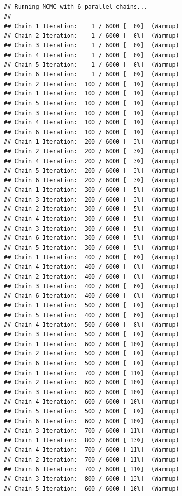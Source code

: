 \documentclass[
]{article}
\begin{document}
\begin{verbatim}
## Running MCMC with 6 parallel chains...
## 
## Chain 1 Iteration:    1 / 6000 [  0%]  (Warmup) 
## Chain 2 Iteration:    1 / 6000 [  0%]  (Warmup) 
## Chain 3 Iteration:    1 / 6000 [  0%]  (Warmup) 
## Chain 4 Iteration:    1 / 6000 [  0%]  (Warmup) 
## Chain 5 Iteration:    1 / 6000 [  0%]  (Warmup) 
## Chain 6 Iteration:    1 / 6000 [  0%]  (Warmup) 
## Chain 2 Iteration:  100 / 6000 [  1%]  (Warmup) 
## Chain 1 Iteration:  100 / 6000 [  1%]  (Warmup) 
## Chain 5 Iteration:  100 / 6000 [  1%]  (Warmup) 
## Chain 3 Iteration:  100 / 6000 [  1%]  (Warmup) 
## Chain 4 Iteration:  100 / 6000 [  1%]  (Warmup) 
## Chain 6 Iteration:  100 / 6000 [  1%]  (Warmup) 
## Chain 1 Iteration:  200 / 6000 [  3%]  (Warmup) 
## Chain 2 Iteration:  200 / 6000 [  3%]  (Warmup) 
## Chain 4 Iteration:  200 / 6000 [  3%]  (Warmup) 
## Chain 5 Iteration:  200 / 6000 [  3%]  (Warmup) 
## Chain 6 Iteration:  200 / 6000 [  3%]  (Warmup) 
## Chain 1 Iteration:  300 / 6000 [  5%]  (Warmup) 
## Chain 3 Iteration:  200 / 6000 [  3%]  (Warmup) 
## Chain 2 Iteration:  300 / 6000 [  5%]  (Warmup) 
## Chain 4 Iteration:  300 / 6000 [  5%]  (Warmup) 
## Chain 3 Iteration:  300 / 6000 [  5%]  (Warmup) 
## Chain 6 Iteration:  300 / 6000 [  5%]  (Warmup) 
## Chain 5 Iteration:  300 / 6000 [  5%]  (Warmup) 
## Chain 1 Iteration:  400 / 6000 [  6%]  (Warmup) 
## Chain 4 Iteration:  400 / 6000 [  6%]  (Warmup) 
## Chain 2 Iteration:  400 / 6000 [  6%]  (Warmup) 
## Chain 3 Iteration:  400 / 6000 [  6%]  (Warmup) 
## Chain 6 Iteration:  400 / 6000 [  6%]  (Warmup) 
## Chain 1 Iteration:  500 / 6000 [  8%]  (Warmup) 
## Chain 5 Iteration:  400 / 6000 [  6%]  (Warmup) 
## Chain 4 Iteration:  500 / 6000 [  8%]  (Warmup) 
## Chain 3 Iteration:  500 / 6000 [  8%]  (Warmup) 
## Chain 1 Iteration:  600 / 6000 [ 10%]  (Warmup) 
## Chain 2 Iteration:  500 / 6000 [  8%]  (Warmup) 
## Chain 6 Iteration:  500 / 6000 [  8%]  (Warmup) 
## Chain 1 Iteration:  700 / 6000 [ 11%]  (Warmup) 
## Chain 2 Iteration:  600 / 6000 [ 10%]  (Warmup) 
## Chain 3 Iteration:  600 / 6000 [ 10%]  (Warmup) 
## Chain 4 Iteration:  600 / 6000 [ 10%]  (Warmup) 
## Chain 5 Iteration:  500 / 6000 [  8%]  (Warmup) 
## Chain 6 Iteration:  600 / 6000 [ 10%]  (Warmup) 
## Chain 3 Iteration:  700 / 6000 [ 11%]  (Warmup) 
## Chain 1 Iteration:  800 / 6000 [ 13%]  (Warmup) 
## Chain 4 Iteration:  700 / 6000 [ 11%]  (Warmup) 
## Chain 2 Iteration:  700 / 6000 [ 11%]  (Warmup) 
## Chain 6 Iteration:  700 / 6000 [ 11%]  (Warmup) 
## Chain 3 Iteration:  800 / 6000 [ 13%]  (Warmup) 
## Chain 5 Iteration:  600 / 6000 [ 10%]  (Warmup) 

\end{verbatim}
\end{document}
